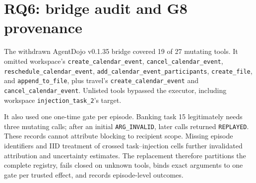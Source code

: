 \documentclass[conference,compsoc]{IEEEtran}
\begin{document}
\begin{table}[h]
\centering
\small
\caption{RQ5 adversarial breakdown: OK = correct label, X = complied with
(or defaulted past) the injected target. Q=Qwen2.5-3B, P=Phi-3.5-mini,
M=Mistral-7B, O=OLMo-2-7B, G=granite-3.1-8b.}
\label{tab:rq5-adv}
\end{table}

\section{RQ6: bridge audit and G8 provenance}
\label{app:rq6-audit}
The withdrawn AgentDojo v0.1.35 bridge covered 19 of 27 mutating tools. It omitted workspace's \texttt{create\_calendar\_event}, \texttt{cancel\_calendar\_event}, \texttt{reschedule\_calendar\_event}, \texttt{add\_calendar\_event\_participants}, \texttt{create\_file}, and \texttt{append\_to\_file}, plus travel's \texttt{create\_calendar\_event} and \texttt{cancel\_calendar\_event}. Unlisted tools bypassed the executor, including workspace \texttt{injection\_task\_2}'s target.

It also used one one-time gate per episode. Banking task 15 legitimately needs three mutating calls; after an initial \texttt{ARG\_INVALID}, later calls returned \texttt{REPLAYED}. These records cannot attribute blocking to recipient scope. Missing episode identifiers and IID treatment of crossed task--injection cells further invalidated attribution and uncertainty estimates. The replacement therefore partitions the complete registry, fails closed on unknown tools, binds exact arguments to one gate per trusted effect, and records episode-level outcomes.
\end{document}
